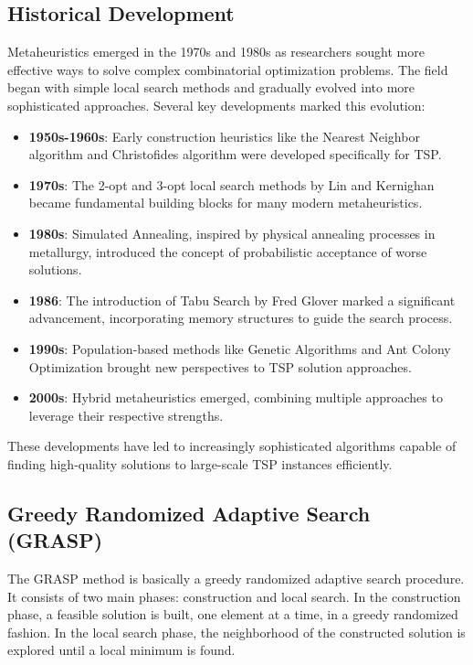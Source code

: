 \documentclass{article}
\begin{document}
\subsection{Historical Development}
Metaheuristics emerged in the 1970s and 1980s as researchers sought more effective ways to solve complex combinatorial optimization problems. 
The field began with simple local search methods and gradually evolved into more sophisticated approaches. Several key developments marked this evolution:

\begin{itemize}
	\item \textbf{1950s-1960s}: Early construction heuristics like the Nearest Neighbor algorithm and Christofides algorithm were developed specifically for TSP.
	
	\item \textbf{1970s}: The 2-opt and 3-opt local search methods by Lin and Kernighan became fundamental building blocks for many modern metaheuristics.
	
	\item \textbf{1980s}: Simulated Annealing, inspired by physical annealing processes in metallurgy, introduced the concept of probabilistic acceptance of worse solutions.
	
	\item \textbf{1986}: The introduction of Tabu Search by Fred Glover marked a significant advancement, incorporating memory structures to guide the search process.
	
	\item \textbf{1990s}: Population-based methods like Genetic Algorithms and Ant Colony Optimization brought new perspectives to TSP solution approaches.
	
	\item \textbf{2000s}: Hybrid metaheuristics emerged, combining multiple approaches to leverage their respective strengths.
\end{itemize}

These developments have led to increasingly sophisticated algorithms capable of finding high-quality solutions to large-scale TSP instances efficiently.


\subsection{Greedy Randomized Adaptive Search (GRASP)}
The GRASP method is basically a greedy randomized adaptive search procedure.
It consists of two main phases: construction and local search.
In the construction phase, a feasible solution is built, one element at a time, in a greedy randomized fashion.
In the local search phase, the neighborhood of the constructed solution is explored until a local minimum is found.
\end{document}
